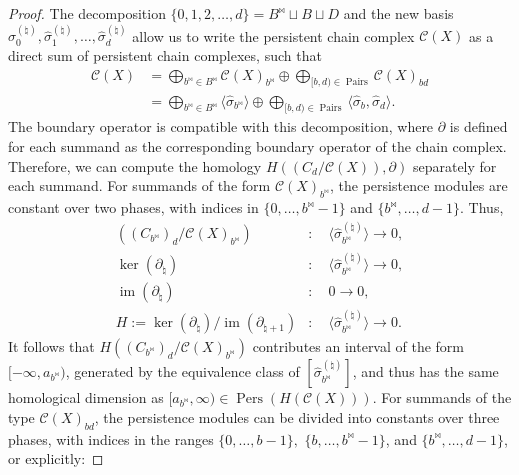 \begin{proof}{\textit{\cite[Proof of Proposition 2.4]{de2011dualities}}}
The decomposition $\{0,1,2,\ldots,d\} = B^\Join \sqcup B \sqcup D$ and the new basis $\hat{\sigma}^{(\natural)}_0, \hat{\sigma}^{(\natural)}_1, \ldots, \hat{\sigma}^{(\natural)}_d$ allow us to write the persistent chain complex $\mathcal{C}(X)$ as a direct sum of persistent chain complexes, such that
\begin{align}
	\mathcal{C}(X) &= \bigoplus_{b^\Join \in B^\Join} \mathcal{C}(X)_{b^\Join} \oplus \bigoplus_{[b,d) \in \operatorname{Pairs}} \mathcal{C}(X)_{bd} \nonumber\\
	&= \bigoplus_{b^\Join \in B^\Join} \langle \hat{\sigma}_{b^\Join} \rangle \oplus \bigoplus_{[b,d) \in \operatorname{Pairs}} \langle \hat{\sigma}_{b}, \hat{\sigma}_{d} \rangle.
\end{align}
The boundary operator is compatible with this decomposition, where $\partial$ is defined for each summand as the corresponding boundary operator of the chain complex. Therefore, we can compute the homology $H((C_d/\mathcal{C}(X)),\partial)$ separately for each summand. For summands of the form $\mathcal{C}(X)_{b^\Join}$, the persistence modules are constant over two phases, with indices in $\{0,\ldots,b^\Join - 1\}$ and $\{b^\Join, \ldots, d-1\}$. Thus,
\begin{align}
	((C_{b^{\Join}})_d/\mathcal{C}(X)_{b^\Join})&: \quad \langle \hat{\sigma}^{(\natural)}_{b^\Join}\rangle \rightarrow 0,\nonumber\\
	\ker(\partial_{\natural})&: \quad \langle \hat{\sigma}^{(\natural)}_{b^\Join}\rangle \rightarrow 0,\nonumber\\
	\operatorname{im}(\partial_{\natural})&: \quad 0 \rightarrow 0,\nonumber\\
	H := \ker(\partial_\natural) / \operatorname{im}(\partial_{\natural+1})&: \quad \langle \hat{\sigma}^{(\natural)}_{b^\Join}\rangle \rightarrow 0.
\end{align}
It follows that $H((C_{b^\Join})_d/\mathcal{C}(X)_{b^\Join})$ contributes an interval of the form $[-\infty, a_{b^\Join})$, generated by the equivalence class of $[\hat{\sigma}^{(\natural)}_{b^\Join}]$, and thus has the same homological dimension as $[a_{b^{\Join}}, \infty) \in \operatorname{Pers}(H(\mathcal{C}(X)))$. For summands of the type $\mathcal{C}(X)_{bd}$, the persistence modules can be divided into constants over three phases, with indices in the ranges $\{0,\ldots,b-1\},$ $\{b,\ldots,b^{\Join}-1\}$, and $\{b^\Join,\ldots, d-1\}$, or explicitly:

\end{proof}
